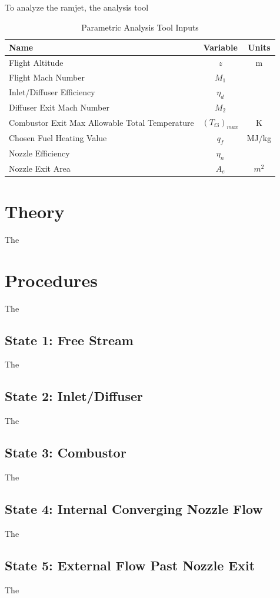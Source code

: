 \documentclass[conf]{new-aiaa} %
\begin{document}
To analyze the ramjet, the analysis tool 

\begin{table}[hbt!]
\caption{\label{tab:table1} Parametric Analysis Tool Inputs}
\centering
\begin{tabular}{lcc}
\hline
Name& Variable& Units\\\hline
Flight Altitude& $z$& m\\
Flight Mach Number& $M_1$\\
Inlet/Diffuser Efficiency& $\eta_d$\\
Diffuser Exit Mach Number& $M_2$\\
Combustor Exit Max Allowable Total Temperature& $(T_{t3})_{max}$& K\\
Chosen Fuel Heating Value& $q_f$& MJ/kg\\
Nozzle Efficiency& $\eta_n$\\
Nozzle Exit Area& $A_e$& $m^2$\\
\hline
\end{tabular}
\end{table}


\section{Theory}
The

\section{Procedures}
The

\subsection{State 1: Free Stream}
The

\subsection{State 2: Inlet/Diffuser}
The

\subsection{State 3: Combustor}
The

\subsection{State 4: Internal Converging Nozzle Flow}
The

\subsection{State 5: External Flow Past Nozzle Exit}
The
\end{document}
